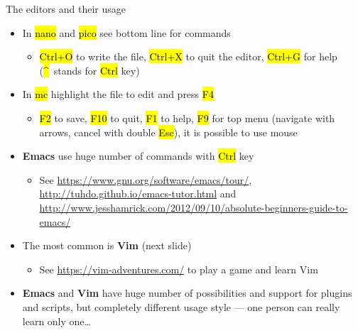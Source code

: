 \documentclass[compress, ucs, xelatex, 11pt, xcolor=svgnames,
  hyperref={
    bookmarks=true,
    unicode=true,
    colorlinks=true,
    pdftitle={Linux, command line and MetaCentrum},
    plainpages=false,
    pdfauthor={Vojtech Zeisek},
    pdfsubject={Course about use of Linux command line, writing shell scripts and using MetaCentrum of CESNET},
    pdfcreator={XeLaTeX},
    pdfkeywords={Linux, GNU, BASH, shell, command line, MetaCentrum},
    linkcolor=DarkRed,
    anchorcolor=DarkBlue,
    citecolor=Indigo,
    filecolor=NavyBlue,
    menucolor=DarkMagenta,
    urlcolor=DarkBlue,
    pdftex},
  url={hyphens, lowtilde} %
  ]{beamer}
\renewcommand{\texttt}[1]{\hl{\ttfamily #1}}
\begin{document}
\begin{frame}{The editors and their usage} %
  \begin{itemize}
    \item In \texttt{nano} and \texttt{pico} see bottom line for commands
    \begin{itemize}
      \item \texttt{Ctrl+O} to write the file, \texttt{Ctrl+X} to quit the editor, \texttt{Ctrl+G} for help (\texttt{\textasciicircum}~stands for \texttt{Ctrl} key)
    \end{itemize}
    \item In \texttt{mc} highlight the file to edit and press \texttt{F4}
    \begin{itemize}
      \item \texttt{F2} to save, \texttt{F10} to quit, \texttt{F1} to help, \texttt{F9} for top menu (navigate with arrows, cancel with double \texttt{Esc}), it is possible to use mouse
    \end{itemize}
    \item \textbf{Emacs} use huge number of commands with \texttt{Ctrl} key
    \begin{itemize}
      \item See \url{https://www.gnu.org/software/emacs/tour/}, \url{http://tuhdo.github.io/emacs-tutor.html} and \url{http://www.jesshamrick.com/2012/09/10/absolute-beginners-guide-to-emacs/}
    \end{itemize}
    \item The most common is \textbf{Vim} (next slide)
    \begin{itemize}
      \item See \url{https://vim-adventures.com/} to play a game and learn Vim
    \end{itemize}
    \item \textbf{Emacs} and \textbf{Vim} have huge number of possibilities and support for plugins and scripts, but completely different usage style --- one person can really learn only one\ldots
  \end{itemize}
\end{frame}
\end{document}
